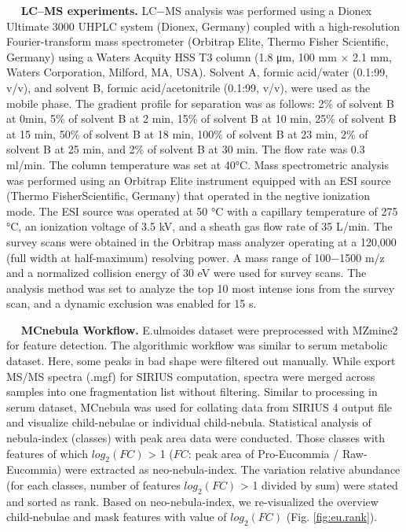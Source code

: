    \textbf{LC--MS experiments.} LC−MS analysis was performed using a
Dionex Ultimate 3000 UHPLC system (Dionex, Germany) coupled with a
high-resolution Fourier-transform mass spectrometer (Orbitrap Elite,
Thermo Fisher Scientific, Germany) using a Waters Acquity HSS T3 column
(1.8 μm, 100 mm \(\times\) 2.1 mm, Waters Corporation, Milford, MA,
USA). Solvent A, formic acid/water (0.1:99, v/v), and solvent B, formic
acid/acetonitrile (0.1:99, v/v), were used as the mobile phase. The
gradient profile for separation was as follows: 2\% of solvent B at
0min, 5\% of solvent B at 2 min, 15\% of solvent B at 10 min, 25\% of
solvent B at 15 min, 50\% of solvent B at 18 min, 100\% of solvent B at
23 min, 2\% of solvent B at 25 min, and 2\% of solvent B at 30 min. The
flow rate was 0.3 ml/min. The column temperature was set at 40°C. Mass
spectrometric analysis was performed using an Orbitrap Elite instrument
equipped with an ESI source (Thermo FisherScientific, Germany) that
operated in the negtive ionization mode. The ESI source was operated at
50 °C with a capillary temperature of 275 °C, an ionization voltage of
3.5 kV, and a sheath gas flow rate of 35 L/min. The survey scans were
obtained in the Orbitrap mass analyzer operating at a 120,000 (full
width at half-maximum) resolving power. A mass range of 100−1500 m/z and
a normalized collision energy of 30 eV were used for survey scans. The
analysis method was set to analyze the top 10 most intense ions from the
survey scan, and a dynamic exclusion was enabled for 15 s.

   \textbf{MCnebula Workflow.} E.ulmoides dataset were preprocessed with
MZmine2 for feature detection. The algorithmic workflow was similar to
serum metabolic dataset. Here, some peaks in bad shape were filtered out
manually. While export MS/MS spectra (.mgf) for SIRIUS computation,
spectra were merged across samples into one fragmentation list without
filtering. Similar to processing in serum dataset, MCnebula was used for
collating data from SIRIUS 4 output file and visualize child-nebulae or
individual child-nebula. Statistical analysis of nebula-index (classes)
with peak area data were conducted. Those classes with features of which
\textbar{}\(log_{2}(FC)\)\textbar{} \textgreater{} 1 (\(FC\): peak area
of Pro-Eucommia / Raw-Eucommia) were extracted as neo-nebula-index. The
variation relative abundance (for each classes, number of features
\textbar{}\(log_{2}(FC)\)\textbar{} \textgreater{} 1 divided by sum)
were stated and sorted as rank. Based on neo-nebula-index, we
re-visualized the overview child-nebulae and mask features with value of
\(log_{2}(FC)\) (Fig.
{\protect\NoHyper\ref{fig:eu.rank}\protect\endNoHyper}).

